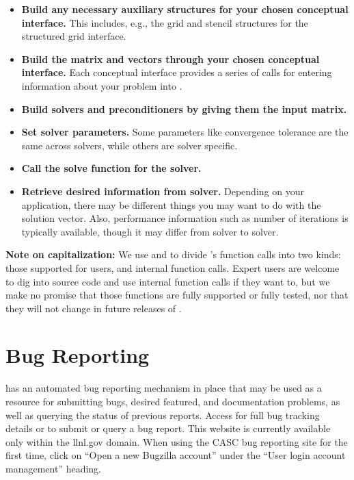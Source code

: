 \begin{itemize}

\item
{\bf Build any necessary auxiliary structures for your chosen conceptual
interface.} This includes, e.g., 
the grid and stencil structures for the structured grid interface.

\item
{\bf Build the matrix and vectors through your chosen conceptual interface.} Each
conceptual interface 
provides a series of calls for entering information about your problem into
\hypre{}.

\item
{\bf Build solvers and preconditioners by giving them the input matrix.}

\item
{\bf Set solver parameters.} Some parameters like convergence tolerance are the
same across solvers, 
while others are solver specific.

\item
{\bf Call the solve function for the solver.}

\item
{\bf Retrieve desired information from solver.} Depending on your application,
there may be different 
things you may want to do with the solution vector. Also, performance
information such as number of 
iterations is typically available, though it may differ from solver to solver.

\end{itemize}


{\bf Note on capitalization:} We use  and 
to divide \hypre{}'s function
calls into two kinds: 
those supported for users, and internal function calls. Expert users are
welcome to dig into \hypre{} source 
code and use internal function calls if they want to, but we make no promise
that those functions are fully 
supported or fully tested, nor that they will not change in future releases of
\hypre{}. 

\section{Bug Reporting}

\hypre{} has an automated bug reporting mechanism in place that may be used as a resource for submitting bugs, desired featured, and documentation problems, as well as querying the status of previous reports.   Access  for full bug tracking details or to submit or query a bug report.  This website is currently available only within the llnl.gov domain.  When using the CASC bug reporting site for the first time, click on ``Open a new Bugzilla account'' under the ``User login account management'' heading.    
 


